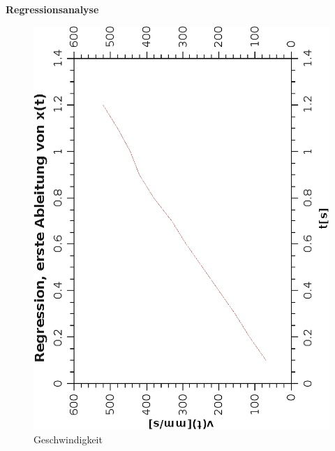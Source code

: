 \documentclass{article}
\begin{document}
\textbf{Regressionsanalyse}
\begin{figure}[H]
\caption{Geschwindigkeit}
\begin{center}
\includegraphics[scale=0.7,angle=-90]{RegressionGeschw.eps}
\end{center}
\end{figure}
\end{document}
